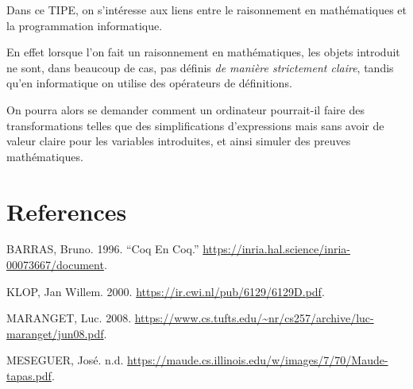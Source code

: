 \newpage

\center{}

Dans ce TIPE, on s'intéresse aux liens entre le raisonnement en
mathématiques et la programmation informatique.

En effet lorsque l'on fait un raisonnement en mathématiques, les objets
introduit ne sont, dans beaucoup de cas, pas définis \emph{de manière
strictement claire}, tandis qu'en informatique on utilise des opérateurs
de définitions.

On pourra alors se demander comment un ordinateur pourrait-il faire des
transformations telles que des simplifications d'expressions mais sans
avoir de valeur claire pour les variables introduites, et ainsi simuler
des preuves mathématiques.

\newpage

\section*{References}\label{references}

\label{refs}
\begin{CSLReferences}{1}{0}
BARRAS, Bruno. 1996. {``Coq En Coq.''}
\url{https://inria.hal.science/inria-00073667/document}.

KLOP, Jan Willem. 2000. \url{https://ir.cwi.nl/pub/6129/6129D.pdf}.

MARANGET, Luc. 2008.
\url{https://www.cs.tufts.edu/~nr/cs257/archive/luc-maranget/jun08.pdf}.

MESEGUER, José. n.d.
\url{https://maude.cs.illinois.edu/w/images/7/70/Maude-tapas.pdf}.

\end{CSLReferences}

